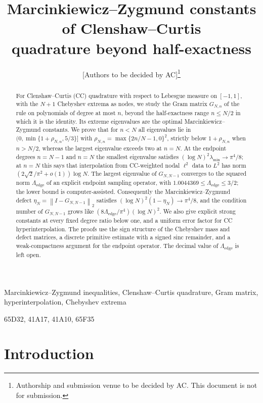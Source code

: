 \documentclass{siamart251216}
\title{Marcinkiewicz--Zygmund constants of Clenshaw--Curtis\texorpdfstring{\\}{ }quadrature beyond half-exactness}
\author{[Authors to be decided by AC]\thanks{Authorship and submission venue to be decided by AC. This document is not for submission.}}
\newcommand{\norm}[1]{\left\lVert#1\right\rVert}
\begin{document}
\maketitle
\begin{abstract}
For Clenshaw--Curtis (CC) quadrature with respect to Lebesgue measure on
$[-1,1]$, with the $N+1$ Chebyshev extrema as nodes, we study the Gram matrix
$G_{N,n}$ of the rule on polynomials of degree at most $n$, beyond the
half-exactness range $n\le N/2$ in which it is the identity. Its extreme
eigenvalues are the optimal Marcinkiewicz--Zygmund constants. We prove that
for $n<N$ all eigenvalues lie in
$(0,\min\{1+\rho_{N,n},5/3\}]$ with $\rho_{N,n}=\max\{2n/N-1,0\}^2$, strictly
below $1+\rho_{N,n}$ when $n>N/2$, whereas the largest eigenvalue exceeds two
at $n=N$. At the endpoint degrees $n=N-1$ and $n=N$ the smallest eigenvalue
satisfies $(\log N)^2\lambda_{\min}\to\pi^4/8$; at $n=N$ this says that
interpolation from CC-weighted nodal $\ell^2$ data to $L^2$ has norm
$(2\sqrt2/\pi^2+o(1))\log N$. The largest eigenvalue of $G_{N,N-1}$ converges
to the squared norm $\Lambda_{\mathrm{edge}}$ of an explicit endpoint sampling
operator, with $1.0044369\le\Lambda_{\mathrm{edge}}\le3/2$; the lower bound is
computer-assisted. Consequently the Marcinkiewicz--Zygmund defect
$\eta_N=\norm{I-G_{N,N-1}}_2$ satisfies $(\log N)^2(1-\eta_N)\to\pi^4/8$, and
the condition number of $G_{N,N-1}$ grows like
$(8\Lambda_{\mathrm{edge}}/\pi^4)(\log N)^2$.
We also give explicit strong constants at every fixed degree ratio below one,
and a uniform error factor for CC hyperinterpolation. The proofs use the sign
structure of the Chebyshev mass and defect matrices, a discrete primitive
estimate with a signed sinc remainder, and a weak-compactness argument for
the endpoint operator. The decimal value of $\Lambda_{\mathrm{edge}}$ is
left open.
\end{abstract}

\begin{keywords}
Marcinkiewicz--Zygmund inequalities, Clenshaw--Curtis quadrature, Gram matrix, hyperinterpolation, Chebyshev extrema
\end{keywords}

\begin{MSCcodes}
65D32, 41A17, 41A10, 65F35
\end{MSCcodes}



\section{Introduction}\label{sec:context}
\end{document}
